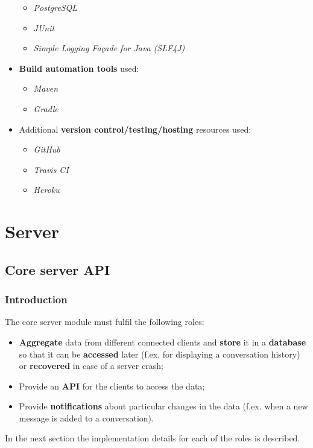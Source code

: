 \documentclass[12p, a4paper, onecolumn]{report}
\begin{document}
\begin{itemize}
\begin{itemize}
\item \emph{PostgreSQL}
\item \emph{JUnit}
\item \emph{Simple Logging Façade for Java (SLF4J)}
\end{itemize}
\item \textbf{Build automation tools} used:
\begin{itemize}
\item \emph{Maven}
\item \emph{Gradle}
\end{itemize}
\item Additional \textbf{version control/testing/hosting} resources used:
\begin{itemize}
\item \emph{GitHub}
\item \emph{Travis CI}
\item \emph{Heroku}
\end{itemize}
\end{itemize}

\section{Server}

\subsection{Core server API}

\subsubsection{Introduction}

The core server module must fulfil the following roles:
\begin{itemize}
\item \textbf{Aggregate} data from different connected clients and \textbf{store} it in a \textbf{database} so that it can be \textbf{accessed} later (f.ex. for displaying a conversation history) or \textbf{recovered} in case of a server crash;
\item Provide an \textbf{API} for the clients to access the data;
\item Provide \textbf{notifications} about particular changes in the data (f.ex. when a new message is added to a conversation).
\end{itemize}
In the next section the implementation details for each of the roles is described.
\end{document}
